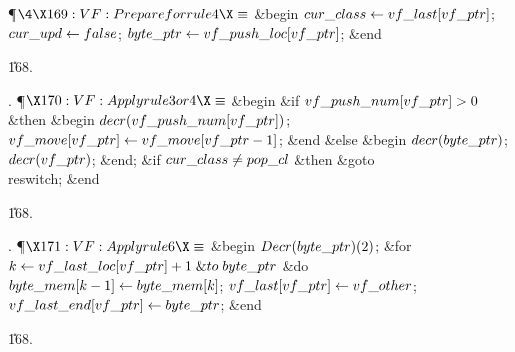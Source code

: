 \Y\P$\4\X169:VF: Prepare for rule 4\X\S$\6
\&{begin} $\\{cur\_class}\gets\\{vf\_last}[\\{vf\_ptr}]$;\5
$\\{cur\_upd}\gets\\{false}$;\5
$\\{byte\_ptr}\gets\\{vf\_push\_loc}[\\{vf\_ptr}]$;\6
\&{end}\par
\U168.\fi

. \P$\X170:VF: Apply rule 3 or 4\X\S$\6
\&{begin} \&{if} $\\{vf\_push\_num}[\\{vf\_ptr}]>0$ \1\&{then}\6
\&{begin} $\\{decr}(\\{vf\_push\_num}[\\{vf\_ptr}])$;\5
$\\{vf\_move}[\\{vf\_ptr}]\gets\\{vf\_move}[\\{vf\_ptr}-1]$;\6
\&{end}\6
\4\&{else} \&{begin} $\\{decr}(\\{byte\_ptr})$;\5
$\\{decr}(\\{vf\_ptr})$;\6
\&{end};\2\6
\&{if} $\\{cur\_class}\ne\\{pop\_cl}$ \1\&{then}\5
\&{goto} \\{reswitch};\2\6
\&{end}\par
\U168.\fi

. \P$\X171:VF: Apply rule 6\X\S$\6
\&{begin} $\\{Decr}(\\{byte\_ptr})(2)$;\6
\&{for} $\hbox{$k$}\gets\\{vf\_last\_loc}[\\{vf\_ptr}]+1\mathrel{\&{to}}\\{byte\_ptr}$ \1%
\&{do}\5
$\\{byte\_mem}[\hbox{$k$}-1]\gets\\{byte\_mem}[\hbox{$k$}]$;\2\6
$\\{vf\_last}[\\{vf\_ptr}]\gets\\{vf\_other}$;\5
$\\{vf\_last\_end}[\\{vf\_ptr}]\gets\\{byte\_ptr}$;\6
\&{end}\par
\U168.\fi

